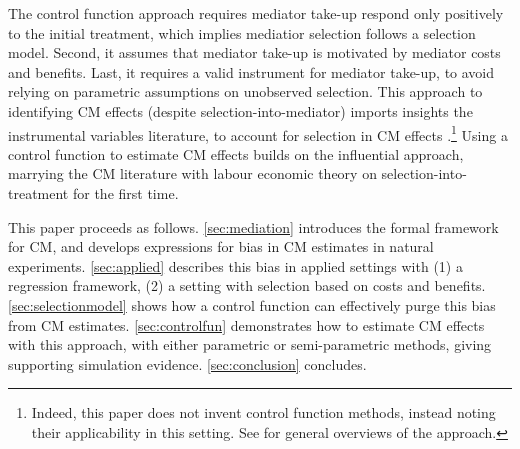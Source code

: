 The control function approach requires mediator take-up respond only positively to the initial treatment, which implies mediatior selection follows a selection model.
Second, it assumes that mediator take-up is motivated by mediator costs and benefits.
Last, it requires a valid instrument for mediator take-up, to avoid relying on parametric assumptions on unobserved selection.
This approach to identifying CM effects (despite selection-into-mediator) imports insights the instrumental variables literature, to account for selection in CM effects \citep{vytlacil2002independence,heckman2004using,heckman2005structural,florens2008identification,kline2019heckits}.\footnote{
    Indeed, this paper does not invent control function methods, instead noting their applicability in this setting.
    See \cite{wooldridge2015control,imbens2007nonadditive} for general overviews of the approach.
}
Using a control function to estimate CM effects builds on the influential \cite{imai2010identification} approach, marrying the CM literature with labour economic theory on selection-into-treatment for the first time. 

This paper proceeds as follows.
\autoref{sec:mediation} introduces the formal framework for CM, and develops expressions for bias in CM estimates in natural experiments.
\autoref{sec:applied} describes this bias in applied settings with (1) a regression framework, (2) a setting with selection based on costs and benefits.
\autoref{sec:selectionmodel} shows how a control function can effectively purge this bias from CM estimates.
\autoref{sec:controlfun} demonstrates how to estimate CM effects with this approach, with either parametric or semi-parametric methods, giving supporting simulation evidence.
\autoref{sec:conclusion} concludes.
